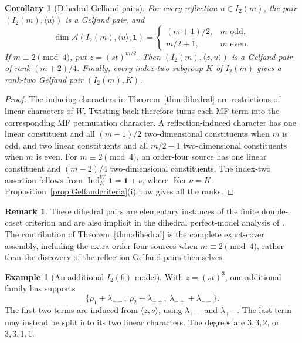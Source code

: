 \documentclass[11pt]{article}
\numberwithin{equation}{section}
\newtheorem{corollary}[theorem]{Corollary}
\theoremstyle{definition}
\newtheorem{example}[theorem]{Example}
\newtheorem{remark}[theorem]{Remark}
\DeclareMathOperator{\Ind}{Ind}
\DeclareMathOperator{\Ker}{Ker}
\newcommand{\one}{\mathbf 1}
\begin{document}
\begin{corollary}[Dihedral Gelfand pairs]
\label{cor:dihedralGelfand}
For every reflection \(u\in I_2(m)\), the pair
\((I_2(m),\langle u\rangle)\) is a Gelfand pair, and
\[
 \dim\mathscr A(I_2(m),\langle u\rangle,\one)
 =\begin{cases}(m+1)/2,&m\text{ odd},\\m/2+1,&m\text{ even}.
 \end{cases}
\]
If \(m\equiv2\pmod4\), put \(z=(st)^{m/2}\).  Then
\((I_2(m),\langle z,u\rangle)\) is a Gelfand pair of rank
\((m+2)/4\).
Finally, every index-two subgroup \(K\) of \(I_2(m)\) gives a
rank-two Gelfand pair \((I_2(m),K)\).
\end{corollary}
\begin{proof}
The inducing characters in Theorem~\ref{thm:dihedral} are restrictions
of linear characters of \(W\).  Twisting back therefore turns each MF
term into the corresponding MF permutation character.
A reflection-induced character has one linear constituent and all
\((m-1)/2\) two-dimensional constituents when \(m\) is odd, and two
linear constituents and all \(m/2-1\) two-dimensional constituents
when \(m\) is even.
For \(m\equiv2\pmod4\), an order-four source has one linear
constituent and \((m-2)/4\) two-dimensional constituents.
The index-two assertion follows from
\(\Ind_K^W\one=\one+\nu\), where \(\Ker\nu=K\).
Proposition~\ref{prop:Gelfandcriteria}(i) now gives all the ranks.
\end{proof}

\begin{remark}
These dihedral pairs are elementary instances of the finite
double-coset criterion and are also implicit in the dihedral
perfect-model analysis of \cite{MZperfect}.
The contribution of Theorem~\ref{thm:dihedral} is the complete
exact-cover assembly, including the extra order-four sources when
\(m\equiv2\pmod4\), rather than the discovery of the reflection
Gelfand pairs themselves.
\end{remark}

\begin{example}[An additional \(I_2(6)\) model]
With \(z=(st)^3\), one additional family has supports
\[
 \{\rho_1+\lambda_{+-},\ \rho_2+\lambda_{++},\
          \lambda_{-+}+\lambda_{--}\}.
\]
The first two terms are induced from \(\langle z,s\rangle\), using \(\lambda_{+-}\) and \(\lambda_{++}\).
The last term may instead be split into its two linear characters.
The degrees are \(3,3,2\), or \(3,3,1,1\).
\end{example}
\end{document}
